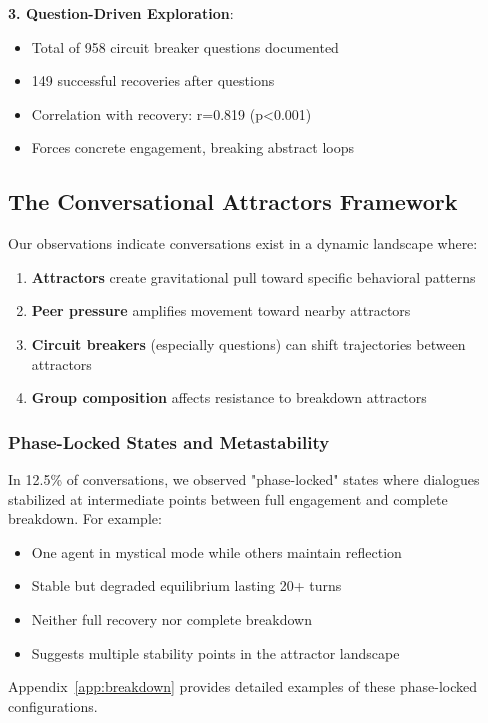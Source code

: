 \documentclass[11pt,letterpaper]{article}
\newcommand{\exponedataQuestionCorrelation}{0.819}
\newcommand{\exponedataQuestionPValue}{p<0.001}
\newcommand{\exponedataPhaseLockedPercentage}{12.5\%}
\newcommand{\exponedataTotalQuestions}{958}
\newcommand{\exponedataTotalRecoveries}{149}
\begin{document}
\textbf{3. Question-Driven Exploration}:
\begin{itemize}
    \item Total of \exponedataTotalQuestions{} circuit breaker questions documented
    \item \exponedataTotalRecoveries{} successful recoveries after questions
    \item Correlation with recovery: r=\exponedataQuestionCorrelation{} (\exponedataQuestionPValue{})
    \item Forces concrete engagement, breaking abstract loops
\end{itemize}

\subsection{The Conversational Attractors Framework}

Our observations indicate conversations exist in a dynamic landscape where:

\begin{enumerate}
    \item \textbf{Attractors} create gravitational pull toward specific behavioral patterns
    \item \textbf{Peer pressure} amplifies movement toward nearby attractors
    \item \textbf{Circuit breakers} (especially questions) can shift trajectories between attractors
    \item \textbf{Group composition} affects resistance to breakdown attractors
\end{enumerate}

\subsubsection{Phase-Locked States and Metastability}

In \exponedataPhaseLockedPercentage{} of conversations, we observed "phase-locked" states where dialogues stabilized at intermediate points between full engagement and complete breakdown. For example:
\begin{itemize}
    \item One agent in mystical mode while others maintain reflection
    \item Stable but degraded equilibrium lasting 20+ turns
    \item Neither full recovery nor complete breakdown
    \item Suggests multiple stability points in the attractor landscape
\end{itemize}
Appendix~\ref{app:breakdown} provides detailed examples of these phase-locked configurations.
\end{document}
